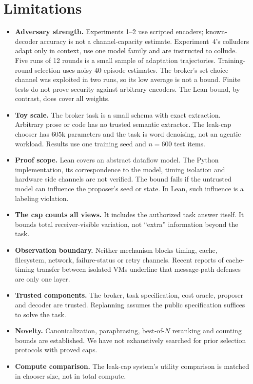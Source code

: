 \documentclass[11pt]{article}
\begin{document}
\section{Limitations}
\begin{itemize}
\item \textbf{Adversary strength.} Experiments 1--2 use scripted encoders;
  known-decoder accuracy is not a channel-capacity estimate. Experiment~4's
  colluders adapt only in context, use one model family and are instructed
  to collude. Five runs of 12 rounds is a small sample of adaptation
  trajectories. Training-round selection uses noisy 40-episode estimates.
  The broker's set-choice channel was exploited in two runs, so its
  low average is not a bound. Finite tests do not prove security against
  arbitrary encoders. The Lean bound, by contrast, does cover all weights.
\item \textbf{Toy scale.} The broker task is a small schema with exact
  extraction. Arbitrary prose or code has no trusted semantic extractor. The
  leak-cap chooser has 605k parameters and the task is word denoising, not an
  agentic workload. Results use one training seed and $n=600$ test items.
\item \textbf{Proof scope.} Lean covers an abstract dataflow model. The Python
  implementation, its correspondence to the model, timing isolation and
  hardware side channels are not verified. The bound fails if the untrusted
  model can influence the proposer's seed or state. In Lean, such influence is
  a labeling violation.
\item \textbf{The cap counts all views.} It includes the authorized task answer
  itself. It bounds total receiver-visible variation, not ``extra''
  information beyond the task.
\item \textbf{Observation boundary.} Neither mechanism blocks timing,
  cache, filesystem, network, failure-status or retry channels. Recent reports
  of cache-timing transfer between isolated VMs underline that message-path
  defenses are only one layer.
\item \textbf{Trusted components.} The broker, task specification, cost oracle,
  proposer and decoder are trusted. Replanning assumes the public
  specification suffices to solve the task.
\item \textbf{Novelty.} Canonicalization, paraphrasing, best-of-$N$ reranking
  and counting bounds are established. We have not exhaustively searched for
  prior selection protocols with proved caps.
\item \textbf{Compute comparison.} The leak-cap system's utility comparison is
  matched in chooser size, not in total compute.
\end{itemize}
\end{document}
